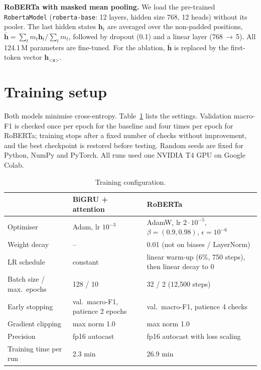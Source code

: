 \documentclass[11pt,a4paper]{article}
\begin{document}
\textbf{RoBERTa with masked mean pooling.} We load the pre-trained \texttt{RobertaModel} (\texttt{roberta-base}: 12 layers, hidden size 768, 12 heads) without its pooler. The last hidden states $\mathbf{h}_t$ are averaged over the non-padded positions,
$\bar{\mathbf{h}}=\sum_t m_t\mathbf{h}_t\big/\sum_t m_t$,
followed by dropout (0.1) and a linear layer (768\,$\rightarrow$\,5). All 124.1\,M parameters are fine-tuned. For the ablation, $\bar{\mathbf{h}}$ is replaced by the first-token vector $\mathbf{h}_{\texttt{<s>}}$.

\section{Training setup}
Both models minimise cross-entropy. Table~\ref{tab:train} lists the settings. Validation macro-F1 is checked once per epoch for the baseline and four times per epoch for RoBERTa; training stops after a fixed number of checks without improvement, and the best checkpoint is restored before testing. Random seeds are fixed for Python, NumPy and PyTorch. All runs used one NVIDIA T4 GPU on Google Colab.

\begin{table}[htbp]
\centering\small
\caption{Training configuration.}
\label{tab:train}
\begin{tabular}{lll}
\toprule
 & \textbf{BiGRU + attention} & \textbf{RoBERTa} \\
\midrule
Optimiser & Adam, lr $10^{-3}$ & AdamW, lr $2\cdot10^{-5}$, $\beta=(0.9,0.98)$, $\epsilon=10^{-6}$ \\
Weight decay & -- & 0.01 (not on biases / LayerNorm) \\
LR schedule & constant & linear warm-up (6\%, 750 steps), then linear decay to 0 \\
Batch size / max.\ epochs & 128 / 10 & 32 / 2 (12{,}500 steps) \\
Early stopping & val.\ macro-F1, patience 2 epochs & val.\ macro-F1, patience 4 checks \\
Gradient clipping & max norm 1.0 & max norm 1.0 \\
Precision & fp16 autocast & fp16 autocast with loss scaling \\
Training time per run & 2.3 min & 26.9 min \\
\bottomrule
\end{tabular}
\end{table}
\end{document}
